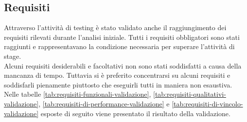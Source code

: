 \subsection{Requisiti}
\label{sec:validazione-requisiti}
\noindent Attraverso l’attività di testing è stato validato anche il raggiungimento dei requisiti rilevati
durante l'analisi iniziale.
Tutti i requisiti obbligatori sono stati raggiunti e rappresentavano la condizione
necessaria per superare l'attività di stage.\\
Alcuni requisiti desiderabili e facoltativi non sono stati soddisfatti a causa della mancanza di tempo.
Tuttavia si è preferito concentrarsi su alcuni requisiti e soddisfarli pienamente
piuttosto che eseguirli tutti in maniera non esaustiva.
Nelle tabelle \ref{tab:requisiti-funzionali-validazione}, \ref{tab:requisiti-qualitativi-validazione}, \ref{tab:requisiti-di-performance-validazione} e \ref{tab:requisiti-di-vincolo-validazione} esposte di seguito viene presentato il risultato della validazione.

